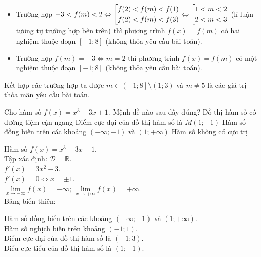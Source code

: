 \begin{ex}
{\begin{itemize}
   \item Trường hợp $-3 < f(m) < 2 \Leftrightarrow \left[\begin{aligned}& f(2) < f(m) < f(1) \\& f(2) < f(m) < f(3)\end{aligned}\right. \Leftrightarrow \left[\begin{aligned}& 1 < m < 2 \\& 2 < m <3\end{aligned}\right.$ (lí luận tương tự trường hợp bên trên) thì phương trình $f(x) = f(m)$ có hai nghiệm thuộc đoạn $\left[-1;8\right]$ (không thỏa yêu cầu bài toán).
   \item Trường hợp $ f(m) = -3 \Leftrightarrow m = 2$ thì phương trình $f(x) = f(m)$ có một nghiệm thuộc đoạn $\left[-1;8\right]$ (không thỏa yêu cầu bài toán).
  \end{itemize}
  Kết hợp các trường hợp ta được $m \in \left(-1;8\right] \setminus \left(1;3\right)$ và $m \neq 5$ là các giá trị thỏa mãn yêu cầu bài toán.
  }
\end{ex}


\begin{ex}%
 Cho hàm số $f(x) = x^3 - 3x + 1$. Mệnh đề nào sau đây đúng?
 \choice
  {Đồ thị hàm số có đường tiệm cận ngang}
  {Điểm cực đại của đồ thị hàm số là $M(1;-1)$}
  {\True Hàm số đồng biến trên các khoảng $(-\infty; -1)$ và $(1; +\infty)$}
  {Hàm số không có cực trị}
 \loigiai
  {
  Hàm số $f(x) = x^3 - 3x + 1$.\\
  Tập xác định: $\mathscr{D} = \mathbb{R}$.\\
  $f'(x) = 3x^2 - 3$.\\
  $f'(x) = 0 \Leftrightarrow x = \pm 1$.\\
  $\lim\limits_{x \to -\infty} f(x) = -\infty$; \hspace*{1cm} $\lim\limits_{x \to +\infty} f(x) = +\infty$.\\
  Bảng biến thiên:
  \begin{center}
  \end{center}
  Hàm số đồng biến trên các khoảng $(-\infty; - 1)$ và $(1; +\infty)$.\\
  Hàm số nghịch biến trên khoảng $(-1;1)$.\\
  Điểm cực đại của đồ thị hàm số là $(-1;3)$.\\
  Điểu cực tiểu của đồ thị hàm số là $(1;-1)$.
  }
\end{ex}


